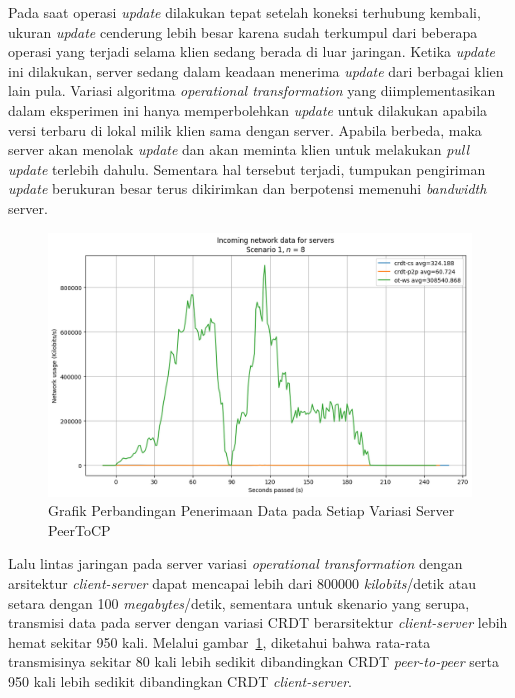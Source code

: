 Pada saat operasi \textit{update} dilakukan tepat setelah koneksi terhubung kembali, ukuran \textit{update} cenderung lebih besar karena sudah terkumpul dari beberapa operasi yang terjadi selama klien sedang berada di luar jaringan. Ketika \textit{update} ini dilakukan, server sedang dalam keadaan menerima \textit{update} dari berbagai klien lain pula. Variasi algoritma \textit{operational transformation} yang diimplementasikan dalam eksperimen ini hanya memperbolehkan \textit{update} untuk dilakukan apabila versi terbaru di lokal milik klien sama dengan server. Apabila berbeda, maka server akan menolak \textit{update} dan akan meminta klien untuk melakukan \textit{pull update} terlebih dahulu. Sementara hal tersebut terjadi, tumpukan pengiriman \textit{update} berukuran besar terus dikirimkan dan berpotensi memenuhi \textit{bandwidth} server.

\begin{figure}
 \centering
 \includegraphics[width=15cm]{./assets/skripsi/benchmark-vis_cell_2_output_24}
 \caption{Grafik Perbandingan Penerimaan Data pada Setiap Variasi Server PeerToCP}
 \label{fig:2-24}
\end{figure}

Lalu lintas jaringan pada server variasi \textit{operational transformation} dengan arsitektur \textit{client-server} dapat mencapai lebih dari 800000 \textit{kilobits}/detik atau setara dengan 100 \textit{megabytes}/detik, sementara untuk skenario yang serupa, transmisi data pada server dengan variasi CRDT berarsitektur \textit{client-server} lebih hemat sekitar 950 kali. Melalui gambar~\ref{fig:2-24}, diketahui bahwa rata-rata transmisinya sekitar 80 kali lebih sedikit dibandingkan CRDT \textit{peer-to-peer} serta 950 kali lebih sedikit dibandingkan CRDT \textit{client-server}.

